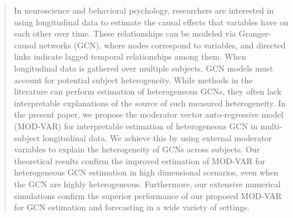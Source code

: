 \documentclass[12pt]{article}
\begin{document}
\bigskip
\begin{abstract}
	In neuroscience and behavioral psychology, researchers are interested in using longitudinal data to estimate the causal effects that variables have on each other over time. These relationships can be modeled via Granger-causal networks (GCN), where nodes correspond to variables, and directed links indicate lagged temporal relationships among them. When longitudinal data is gathered over multiple subjects, GCN models must account for potential subject heterogeneity. While methods in the literature can perform estimation of heterogeneous GCNs, they often lack interpretable explanations of the source of such measured heterogeneity. In the present paper, we propose the moderator vector auto-regressive model (MOD-VAR) for interpretable estimation of heterogeneous GCN in multi-subject longitudinal data. We achieve this by using external moderator variables to explain the heterogeneity of GCNs across subjects. Our theoretical results confirm the improved estimation of MOD-VAR for heterogeneous GCN estimation in high dimensional scenarios, even when the GCN are highly heterogeneous. Furthermore, our extensive numerical simulations confirm the superior performance of our proposed MOD-VAR for GCN estimation and forecasting in a wide variety of settings.  

\end{abstract}
\end{document}

